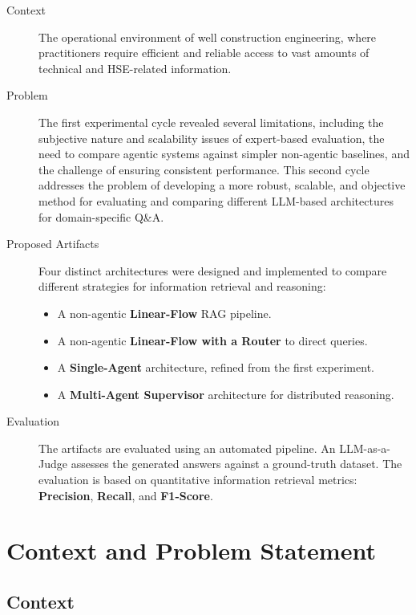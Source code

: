     \begin{description}
        \item[Context] The operational environment of well construction engineering, where practitioners require efficient and reliable access to vast amounts of technical and HSE-related information.

        \item[Problem] The first experimental cycle revealed several limitations, including the subjective nature and scalability issues of expert-based evaluation, the need to compare agentic systems against simpler non-agentic baselines, and the challenge of ensuring consistent performance. This second cycle addresses the problem of developing a more robust, scalable, and objective method for evaluating and comparing different LLM-based architectures for domain-specific Q\&A.

        \item[Proposed Artifacts] Four distinct architectures were designed and implemented to compare different strategies for information retrieval and reasoning:
        \begin{itemize}
            \item A non-agentic \textbf{Linear-Flow} RAG pipeline.
            \item A non-agentic \textbf{Linear-Flow with a Router} to direct queries.
            \item A \textbf{Single-Agent} architecture, refined from the first experiment.
            \item A \textbf{Multi-Agent Supervisor} architecture for distributed reasoning.
        \end{itemize}

        \item[Evaluation] The artifacts are evaluated using an automated pipeline. An LLM-as-a-Judge assesses the generated answers against a ground-truth dataset. The evaluation is based on quantitative information retrieval metrics: \textbf{Precision}, \textbf{Recall}, and \textbf{F1-Score}.
    \end{description}

\section{Context and Problem Statement}

    \subsection{Context}

